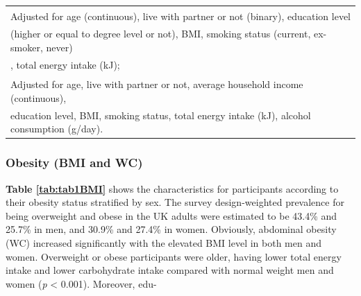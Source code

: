 \begin{table}[H]
\begin{tabular}[t]{lccccc}
		\multicolumn{6}{l}{{\scriptsize \textsuperscript{\dag} Adjusted for age (continuous), live with partner or not (binary), education level}}\\ 
		\multicolumn{6}{l}{{\scriptsize (higher or equal to degree level or not), BMI, smoking status (current, ex-smoker, never)}}\\
		\multicolumn{6}{l}{{\scriptsize , total energy intake (kJ);}}\\
		\multicolumn{6}{l}{{\scriptsize \textsuperscript{\ddag} Adjusted for age, live with partner or not, average household income (continuous),}}\\ 
		\multicolumn{6}{l}{{\scriptsize education level, BMI, smoking status, total energy intake (kJ), alcohol consumption (g/day).}}\\
	\end{tabular}
\end{table}
\vspace{-0.5cm}


\subsubsection{Obesity (BMI and WC)}\vspace{-0.3cm}

\textbf{Table \ref{tab:tab1BMI}} shows the characteristics for participants according to their obesity status stratified by sex. The survey design-weighted prevalence for being overweight and obese in the UK adults were estimated to be 43.4\% and 25.7\% in men, and 30.9\% and 27.4\% in women. Obviously, abdominal obesity (WC) increased significantly with the elevated BMI level in both men and women. Overweight or obese participants were older, having lower total energy intake and lower carbohydrate intake compared with normal weight men and women (\textit{p} < 0.001). Moreover, edu-


